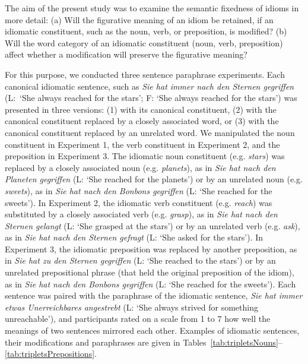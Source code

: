 \documentclass[output=paper]{langsci/langscibook}
\begin{document}
The aim of the present study was to examine the semantic fixedness of idioms in more detail: (a) Will the figurative meaning of an idiom be retained, if an idiomatic constituent, such as the noun, verb, or preposition, is modified?  (b) Will the word category of an idiomatic constituent (noun, verb, preposition) affect whether a modification will preserve the figurative meaning?

For this purpose, we conducted three sentence paraphrase experiments. Each canonical idiomatic sentence, such as \textit{Sie hat immer nach den Sternen gegriffen} (L:~‘She always reached for the stars’; F: `She always reached for the stars’) was presented in three versions: (1) with its canonical constituent, (2) with the canonical constituent replaced by a closely associated word, or (3) with the canonical constituent replaced by an unrelated word. We manipulated the noun constituent in Experiment 1, the verb constituent in Experiment 2, and the preposition in Experiment 3. The idiomatic noun constituent (e.g. \textit{stars}) was replaced by a closely associated noun (e.g. \textit{planets}), as in \textit{Sie hat nach den Planeten gegriffen} (L: ‘She reached for the planets’) or by an unrelated noun (e.g. \textit{sweets}), as in \textit{Sie hat nach den Bonbons gegriffen} (L: ‘She reached for the sweets’). In Experiment 2, the idiomatic verb constituent (e.g. \textit{reach}) was substituted by a closely associated verb (e.g. \textit{grasp}), as in \textit{Sie hat nach den Sternen gelangt} (L: ‘She grasped at the stars’) or by an unrelated verb (e.g. \textit{ask}), as in \textit{Sie hat nach den Sternen gefragt} (L: ‘She asked for the stars’). In Experiment 3, the idiomatic preposition was replaced by another preposition, as in \textit{Sie hat zu den Sternen gegriffen} (L: ‘She reached to the stars’) or by an unrelated prepositional phrase (that held the original preposition of the idiom), as in \textit{Sie hat nach den Bonbons gegriffen} (L: ‘She reached for the sweets’).  Each sentence was paired with the paraphrase of the idiomatic sentence, \textit{Sie hat immer etwas Unerreichbares angestrebt} (L: ‘She always strived for something unreachable’), and participants rated on a scale from 1 to 7 how well the meanings of two sentences mirrored each other. Examples of idiomatic sentences, their modifications and paraphrases are given in Tables~\ref{tab:tripletsNouns}--\ref{tab:tripletsPrepositions}.
\end{document}
